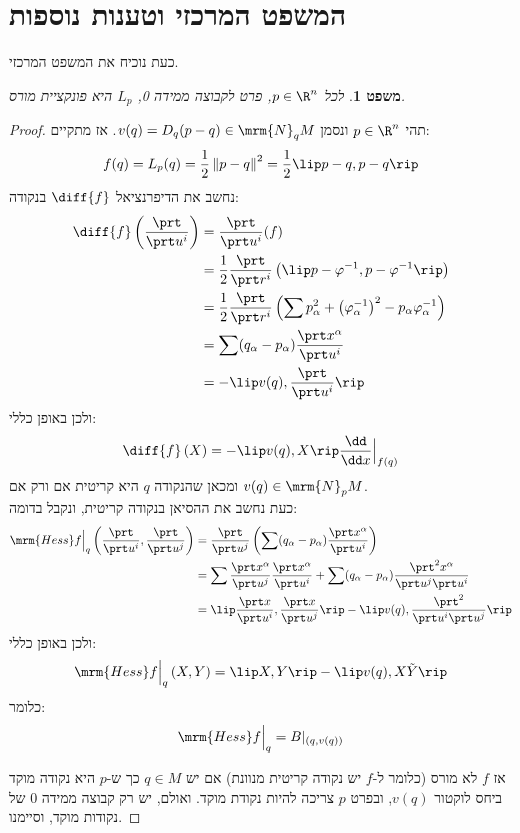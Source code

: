 \documentclass{article}
\newtheorem*{theorem*}{משפט}
\theoremstyle{definition}
\newcommand{\norm}[1]{\left\lVert#1\right\rVert}
\begin{document}
	\section{המשפט המרכזי וטענות נוספות}
	כעת נוכיח את המשפט המרכזי.
	\begin{theorem*}
		לכל
		\(p\in \R^n\),
		פרט לקבוצה ממידה 0, \(L_p\) היא פונקציית מורס.
	\end{theorem*}
	\begin{proof}
		תהי
		\(p\in\R^n\)
		ונסמן
		\(v(q) = D_q(p-q) \in \mrm{N}_q M\).
		אז מתקיים:
		\[
			f(q)
			=L_p(q)
			=\frac{1}{2}\norm{p-q}^2
			=\frac{1}{2}\lip p-q,p-q \rip
		\]
		נחשב את הדיפרנציאל
		\(\diff{f}\)
		בנקודה:
		\begin{equation*}\begin{split}
			\diff{f}\left(\frac{\prt}{\prt u^i}\right)
			&=\frac{\prt}{\prt u^i}(f)
			\\&=\frac{1}{2}\frac{\prt}{\prt r^i}\left(\lip p-\varphi^{-1},p-\varphi^{-1} \rip\right)
			\\&=\frac{1}{2}\frac{\prt}{\prt r^i}\left(\sum p_\alpha^2+\left(\varphi_\alpha^{-1}\right)^2-p_\alpha\varphi_\alpha^{-1}\right)
			\\&=\sum (q_\alpha-p_\alpha)\frac{\prt x^\alpha}{\prt u^i}
			\\&=-\lip v(q),\frac{\prt}{\prt u^i} \rip
		\end{split}\end{equation*}
		ולכן באופן כללי:
		\[
			\diff{f}\left(X\right)
			=-\lip v(q),X \rip \frac{\dd}{\dd x}\Big|_{f(q)}
		\]
		ומכאן שהנקודה \(q\) היא קריטית אם ורק אם
		\(v(q)\in \mrm{N}_p M\).
		\\
		כעת נחשב את ההסיאן בנקודה קריטית, ונקבל בדומה:
		\begin{equation*}\begin{split}
			\mrm{Hess} f\Big|_q\left(\frac{\prt}{\prt u^i},\frac{\prt}{\prt u^j}\right)
			&=\frac{\prt}{\prt u^j}\left(\sum (q_\alpha-p_\alpha)\frac{\prt x^\alpha}{\prt u^i}\right)
			\\&=\sum \frac{\prt x^\alpha}{\prt u^j}\frac{\prt x^\alpha}{\prt u^i}
			+ \sum (q_\alpha-p_\alpha)\frac{\prt^2 x^\alpha}{\prt u^j\prt u^i}
			\\&=\lip \frac{\prt x}{\prt u^i},\frac{\prt x}{\prt u^j} \rip
			- \lip v(q),\frac{\prt^2}{\prt u^i\prt u^j} \rip
		\end{split}\end{equation*}
		ולכן באופן כללי:
		\[
			\mrm{Hess} f\Big|_q\left(X,Y\right)
			=\lip X,Y \rip - \lip v(q),X\tilde{Y} \rip
		\]
		כלומר:
		\[
			\mrm{Hess} f\Big|_q=B|_{(q,v(q))}
		\]
		
		אז \(f\) לא מורס (כלומר ל-\(f\) יש נקודה קריטית מנוונת) אם יש
		\(q \in M\)
		כך ש-\(p\) היא נקודה מוקד ביחס לוקטור
		\(v(q)\),
		ובפרט \(p\) צריכה להיות נקודת מוקד.
		ואולם, יש רק קבוצה ממידה \(0\) של נקודות מוקד, וסיימנו.
	\end{proof}
\end{document}
